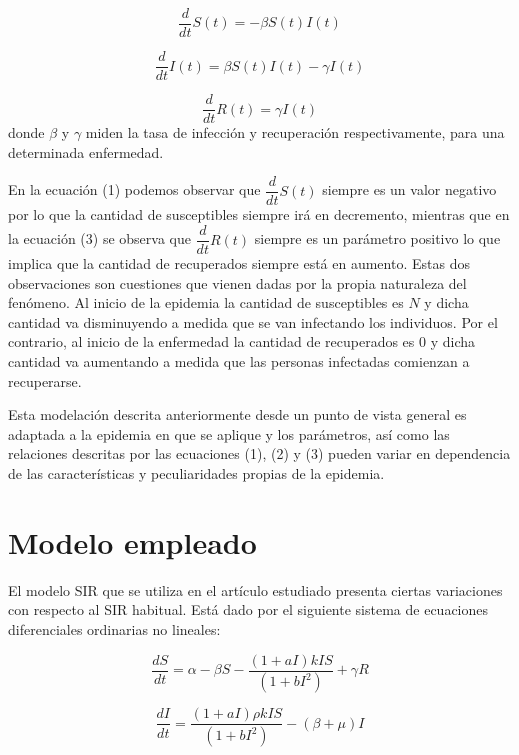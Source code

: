 \documentclass{article}
\begin{document}
    \begin{equation}
    		\dfrac{d}{dt}S(t)=-\beta S(t)I(t)
    \end{equation}
    
    \begin{equation}
    		\dfrac{d}{dt}I(t)=\beta S(t)I(t)-\gamma I(t)
    \end{equation}
    
    \begin{equation}
   		\dfrac{d}{dt}R(t)=\gamma I(t) 
    \end{equation}
donde $\beta$ y $\gamma$ miden la tasa de infección y recuperación respectivamente, para una determinada enfermedad. 

En la ecuación (1) podemos observar que $\dfrac{d}{dt}S(t)$ siempre es un valor negativo por lo que la cantidad de susceptibles siempre irá en decremento, mientras que en la ecuación (3) se observa que $\dfrac{d}{dt}R(t)$ siempre es un parámetro positivo lo que implica que la cantidad de recuperados siempre está en aumento. Estas dos observaciones son cuestiones que vienen dadas por la propia naturaleza del fenómeno. Al inicio de la epidemia la cantidad de susceptibles es $N$ y dicha cantidad va disminuyendo a medida que se van infectando los individuos. Por el contrario, al inicio de la enfermedad la cantidad de recuperados es 0 y dicha cantidad va aumentando a medida que las personas infectadas comienzan a recuperarse.

Esta modelación descrita anteriormente desde un punto de vista general es
adaptada a la epidemia en que se aplique y los parámetros, así como las relaciones descritas por las ecuaciones (1), (2) y (3) pueden variar en dependencia de las características y peculiaridades propias de la epidemia.    


\section{Modelo empleado}

El modelo SIR que se utiliza en el art\'iculo estudiado presenta ciertas variaciones con respecto al SIR habitual. Est\'a dado por el siguiente sistema de ecuaciones diferenciales ordinarias no lineales:

\begin{equation}
    \dfrac{dS}{dt}= \alpha - \beta S - \dfrac{(1+aI)kIS}{(1+bI^2)} + \gamma R
\end{equation}

\begin{equation}
    \dfrac{dI}{dt}= \dfrac{(1+aI)\rho kIS}{(1+bI^2)} - (\beta + \mu)I
\end{equation}
\end{document}

